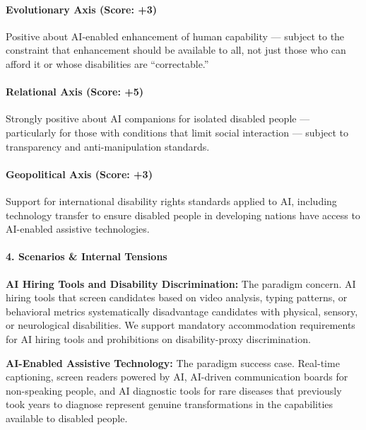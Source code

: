 \paragraph{Evolutionary Axis (Score:
+3)}\label{evolutionary-axis-score-3-1}

Positive about AI-enabled enhancement of human capability --- subject to
the constraint that enhancement should be available to all, not just
those who can afford it or whose disabilities are ``correctable.''

\paragraph{Relational Axis (Score: +5)}\label{relational-axis-score-5-3}

Strongly positive about AI companions for isolated disabled people ---
particularly for those with conditions that limit social interaction ---
subject to transparency and anti-manipulation standards.

\paragraph{Geopolitical Axis (Score:
+3)}\label{geopolitical-axis-score-3-2}

Support for international disability rights standards applied to AI,
including technology transfer to ensure disabled people in developing
nations have access to AI-enabled assistive technologies.

\paragraph{4. Scenarios \& Internal
Tensions}\label{scenarios-internal-tensions-40}

\textbf{AI Hiring Tools and Disability Discrimination:} The paradigm
concern. AI hiring tools that screen candidates based on video analysis,
typing patterns, or behavioral metrics systematically disadvantage
candidates with physical, sensory, or neurological disabilities. We
support mandatory accommodation requirements for AI hiring tools and
prohibitions on disability-proxy discrimination.

\textbf{AI-Enabled Assistive Technology:} The paradigm success case.
Real-time captioning, screen readers powered by AI, AI-driven
communication boards for non-speaking people, and AI diagnostic tools
for rare diseases that previously took years to diagnose represent
genuine transformations in the capabilities available to disabled
people.

